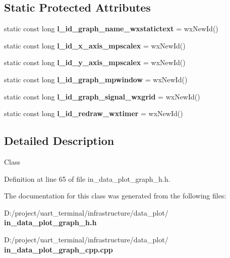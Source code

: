 \subsection*{Static Protected Attributes}
\begin{DoxyCompactItemize}
\item 
static const long \textbf{ l\+\_\+id\+\_\+graph\+\_\+name\+\_\+wxstatictext} = wx\+New\+Id()
\item 
static const long {\bfseries l\+\_\+id\+\_\+x\+\_\+axis\+\_\+mpscalex} = wx\+New\+Id()
\item 
static const long {\bfseries l\+\_\+id\+\_\+y\+\_\+axis\+\_\+mpscalex} = wx\+New\+Id()
\item 
static const long {\bfseries l\+\_\+id\+\_\+graph\+\_\+mpwindow} = wx\+New\+Id()
\item 
static const long {\bfseries l\+\_\+id\+\_\+graph\+\_\+signal\+\_\+wxgrid} = wx\+New\+Id()
\item 
static const long {\bfseries l\+\_\+id\+\_\+redraw\+\_\+wxtimer} = wx\+New\+Id()
\end{DoxyCompactItemize}


\subsection{Detailed Description}
Class 

Definition at line 65 of file in\+\_\+data\+\_\+plot\+\_\+graph\+\_\+h.\+h.



The documentation for this class was generated from the following files\+:\begin{DoxyCompactItemize}
\item 
D\+:/project/uart\+\_\+terminal/infrastructure/data\+\_\+plot/\textbf{ in\+\_\+data\+\_\+plot\+\_\+graph\+\_\+h.\+h}\item 
D\+:/project/uart\+\_\+terminal/infrastructure/data\+\_\+plot/\textbf{ in\+\_\+data\+\_\+plot\+\_\+graph\+\_\+cpp.\+cpp}\end{DoxyCompactItemize}
